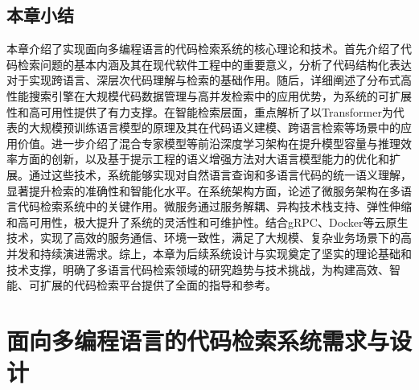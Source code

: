 \documentclass[UTF8,a4paper,12pt]{ctexart}
\numberwithin{equation}{section}
\begin{document}
\subsection{本章小结}
本章介绍了实现面向多编程语言的代码检索系统的核心理论和技术。首先介绍了代码检索问题的基本内涵及其在现代软件工程中的重要意义，分析了代码结构化表达对于实现跨语言、深层次代码理解与检索的基础作用。随后，详细阐述了分布式高性能搜索引擎在大规模代码数据管理与高并发检索中的应用优势，为系统的可扩展性和高可用性提供了有力支撑。在智能检索层面，重点解析了以Transformer为代表的大规模预训练语言模型的原理及其在代码语义建模、跨语言检索等场景中的应用价值。进一步介绍了混合专家模型等前沿深度学习架构在提升模型容量与推理效率方面的创新，以及基于提示工程的语义增强方法对大语言模型能力的优化和扩展。通过这些技术，系统能够实现对自然语言查询和多语言代码的统一语义理解，显著提升检索的准确性和智能化水平。在系统架构方面，论述了微服务架构在多语言代码检索系统中的关键作用。微服务通过服务解耦、异构技术栈支持、弹性伸缩和高可用性，极大提升了系统的灵活性和可维护性。结合gRPC、Docker等云原生技术，实现了高效的服务通信、环境一致性，满足了大规模、复杂业务场景下的高并发和持续演进需求。综上，本章为后续系统设计与实现奠定了坚实的理论基础和技术支撑，明确了多语言代码检索领域的研究趋势与技术挑战，为构建高效、智能、可扩展的代码检索平台提供了全面的指导和参考。
\newpage
{}
\section{面向多编程语言的代码检索系统需求与设计}
\end{document}
